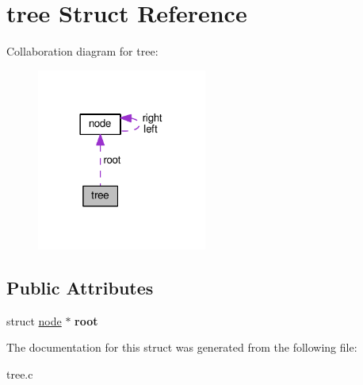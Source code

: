 \hypertarget{structtree}{}\section{tree Struct Reference}
\label{structtree}


Collaboration diagram for tree\+:
\nopagebreak
\begin{figure}[H]
\begin{center}
\leavevmode
\includegraphics[width=158pt]{structtree__coll__graph}
\end{center}
\end{figure}
\subsection*{Public Attributes}
\begin{DoxyCompactItemize}
\item 
struct \hyperlink{structnode}{node} $\ast$ {\bfseries root}\hypertarget{structtree_a0739285fd0d3128fb4997c42cbfa6d0e}{}\label{structtree_a0739285fd0d3128fb4997c42cbfa6d0e}

\end{DoxyCompactItemize}


The documentation for this struct was generated from the following file\+:\begin{DoxyCompactItemize}
\item 
tree.\+c\end{DoxyCompactItemize}
